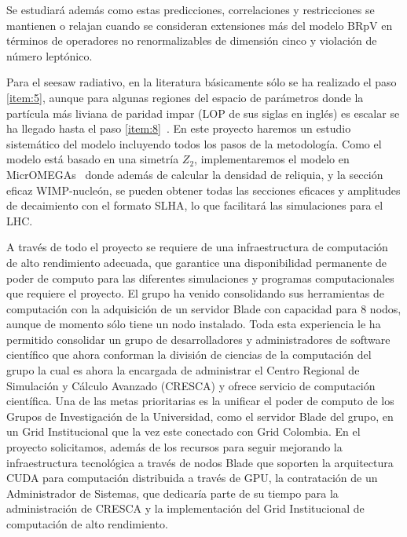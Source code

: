 \begin{bbrpvlhc}
   Se estudiará además como estas predicciones, correlaciones y
   restricciones se mantienen o relajan cuando se consideran
   extensiones más del modelo BRpV en términos de operadores no
   renormalizables de dimensión cinco y violación de número leptónico.  
\end{bbrpvlhc}

\begin{darkmatter}
  Para el seesaw radiativo, en la literatura básicamente sólo se ha
  realizado el paso \ref{item:5}, aunque para algunas regiones del
  espacio de parámetros donde la partícula más liviana de paridad
  impar (LOP de sus siglas en inglés) es escalar se ha llegado hasta
  el paso \ref{item:8}~\cite{Bergman:2007pm}. En este proyecto haremos un
  estudio sistemático del modelo incluyendo todos los pasos de la
  metodología. Como el modelo está basado en una simetría $Z_2$,
  implementaremos el modelo en MicrOMEGAs~\cite{Belanger:2006is,Belanger:2008sj,Belanger:2010gh} donde
  además de calcular la densidad de reliquia, y la sección eficaz
  WIMP-nucleón, se pueden obtener todas las secciones eficaces y
  amplitudes de decaimiento con el formato SLHA, lo que facilitará las
  simulaciones para el LHC.
\end{darkmatter}




A través de todo el proyecto se requiere de una infraestructura de
computación de alto rendimiento adecuada, que garantice una
disponibilidad permanente de poder de computo para las diferentes
simulaciones y programas computacionales que requiere el proyecto. El
grupo ha venido consolidando sus herramientas de computación con la
adquisición de un servidor Blade con capacidad para 8 nodos, aunque de
momento sólo tiene un nodo instalado. Toda esta experiencia le ha
permitido consolidar un grupo de desarrolladores y administradores de
software científico que ahora conforman la división de ciencias de la
computación del grupo la cual es ahora la encargada de administrar el
Centro Regional de Simulación y Cálculo Avanzado (CRESCA) y ofrece
servicio de computación científica.  Una de las metas prioritarias es
la unificar el poder de computo de los Grupos de Investigación de la
Universidad, como el servidor Blade del grupo, en un Grid
Institucional que la vez este conectado con Grid Colombia. En el
proyecto solicitamos, además de los recursos para seguir mejorando la
infraestructura tecnológica a través de nodos Blade que soporten la
arquitectura CUDA para computación distribuida a través de GPU, la
contratación de un Administrador de Sistemas, que dedicaría parte de
su tiempo para la administración de CRESCA y la implementación del
Grid Institucional de computación de alto rendimiento.



